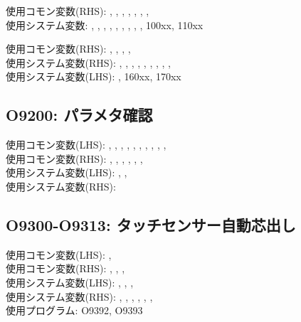 \begin{hosoku}\small
使用コモン変数(RHS): , , , , , , , \\
使用システム変数: , , , , , , , , , \ttNum100xx, \ttNum110xx
\end{hosoku}

\begin{hosoku}\small
使用コモン変数(RHS): , , , , \\
使用システム変数(RHS): , , , , , , , , , \\
使用システム変数(LHS): , \ttNum160xx, \ttNum170xx
\end{hosoku}

\subsection{O9200: パラメタ確認}
\begin{hosoku}\small
使用コモン変数(LHS): , , , , , , , , , , \\
使用コモン変数(RHS): , , , , , , \\
使用システム変数(LHS): , , \\
使用システム変数(RHS): 
\end{hosoku}

\subsection{O9300-O9313: タッチセンサー自動芯出し}
\begin{hosoku}\small
使用コモン変数(LHS): , \\
使用コモン変数(RHS): , , , \\
使用システム変数(LHS): , , , \\
使用システム変数(RHS): , , , , , , \\
使用プログラム: O9392, O9393
\end{hosoku}

